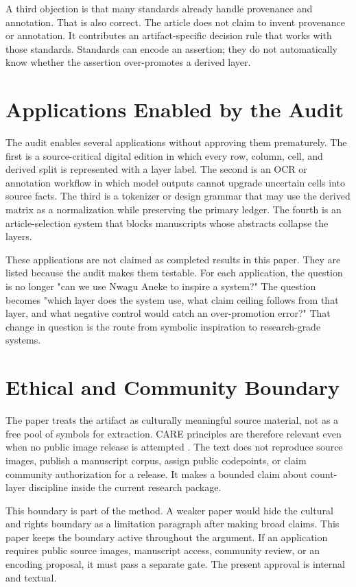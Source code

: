 \documentclass[sigconf,nonacm]{acmart}
\begin{document}
A third objection is that many standards already handle provenance and
annotation. That is also correct. The article does not claim to invent
provenance or annotation. It contributes an artifact-specific decision rule that
works with those standards. Standards can encode an assertion; they do not
automatically know whether the assertion over-promotes a derived layer.

\section{Applications Enabled by the Audit}
The audit enables several applications without approving them prematurely. The
first is a source-critical digital edition in which every row, column, cell, and
derived split is represented with a layer label. The second is an OCR or
annotation workflow in which model outputs cannot upgrade uncertain cells into
source facts. The third is a tokenizer or design grammar that may use the
derived matrix as a normalization while preserving the primary ledger. The
fourth is an article-selection system that blocks manuscripts whose abstracts
collapse the layers.

These applications are not claimed as completed results in this paper. They are
listed because the audit makes them testable. For each application, the question
is no longer "can we use Nwagu Aneke to inspire a system?" The question becomes
"which layer does the system use, what claim ceiling follows from that layer,
and what negative control would catch an over-promotion error?" That change in
question is the route from symbolic inspiration to research-grade systems.

\section{Ethical and Community Boundary}
The paper treats the artifact as culturally meaningful source material, not as a
free pool of symbols for extraction. CARE principles are therefore relevant even
when no public image release is attempted \cite{carroll2020care}. The text
does not reproduce source images, publish a manuscript corpus, assign public
codepoints, or claim community authorization for a release. It makes a bounded
claim about count-layer discipline inside the current research package.

This boundary is part of the method. A weaker paper would hide the cultural and
rights boundary as a limitation paragraph after making broad claims. This paper
keeps the boundary active throughout the argument. If an application requires
public source images, manuscript access, community review, or an encoding
proposal, it must pass a separate gate. The present approval is internal and
textual.
\end{document}
